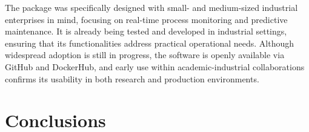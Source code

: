 \documentclass[preprint,12pt, a4paper]{elsarticle}
\begin{document}

The package was specifically designed with small- and medium-sized industrial enterprises in mind, focusing on real-time process monitoring and predictive maintenance. It is already being tested and developed in industrial settings, ensuring that its functionalities address practical operational needs. Although widespread adoption is still in progress, the software is openly available via GitHub and DockerHub, and early use within academic-industrial collaborations confirms its usability in both research and production environments.





\section{Conclusions}
\end{document}
